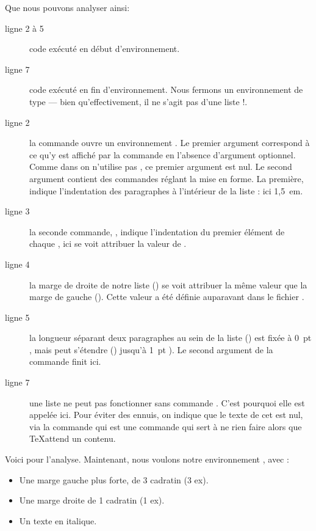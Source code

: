 Que nous pouvons analyser ainsi:
\begin{description}
\item[ligne 2 à 5] code exécuté en début d'environnement.
\item[ligne 7] code exécuté en fin d'environnement. Nous fermons un environnement de type  --- bien qu'effectivement, il ne s'agit pas d'une liste !.
\item[ligne 2] la commande  ouvre un environnement . Le premier argument correspond à ce qu'y est affiché par la commande  en l'absence d'argument optionnel. Comme dans  on n'utilise pas , ce premier argument est nul. Le second argument contient des commandes réglant la mise en forme. La première,  indique l'indentation des paragraphes à l'intérieur de la liste : ici 1,5~em.
\item[ligne 3] la seconde commande, , indique l'indentation du premier élément de chaque , ici  se voit attribuer la valeur de .
\item[ligne 4] la marge de droite de notre liste () se voit attribuer la même valeur que la marge de gauche (). Cette valeur a été définie auparavant dans le fichier .
\item[ligne 5]la longueur séparant deux paragraphes au sein de la liste () est fixée à 0~pt , mais peut s'étendre () jusqu'à 1~pt ). Le second argument de la commande  finit ici.
\item[ligne 7]une liste ne peut pas fonctionner sans commande . C'est pourquoi elle est appelée ici. Pour éviter des ennuis, on indique que le texte de cet  est nul, via la commande  qui est une commande qui sert à ne rien faire alors que \TeX attend un contenu.
\end{description}

Voici pour l'analyse. Maintenant, nous voulons notre environnement , avec :
\begin{itemize}
\item Une marge gauche plus forte, de 3 cadratin (3 ex).
\item Une marge droite de 1 cadratin (1 ex). 
\item Un texte en italique.
\end{itemize}

